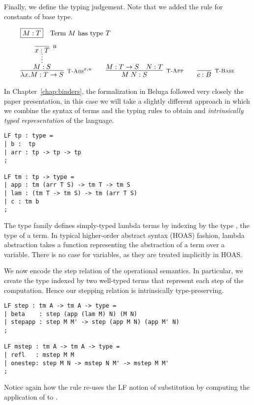Finally, we define the typing judgement. Note that we added the rule
\TBase for constants of base type.

\[
\begin{array}{c}
\multicolumn{1}{l}{\mbox{\fbox{$M:T$}~~ \mbox{Term $M$ has type $T$}}} \\[1em]
\infer[\TFn^{x,u}]{\lam x.M : T \arrow S}
                 {\infer*{M:S}{\infer[u]{x:T}{}}} \qquad
\infer[\TApp]{M\;N : S}{M : T \arrow S & N:T} \qquad
\infer[\TBase]{c : B}{}
\end{array}
\]

In Chapter~\ref{chap:binders}, the formalization in Beluga followed
very closely the paper presentation, in this case we will take a
slightly different approach in which we combine the syntax of terms
and the typing rules to obtain and \emph{intrinsically typed
  representation} of the language.

\begin{lstlisting}
LF tp : type =
| b :  tp
| arr : tp -> tp -> tp
;

LF tm : tp -> type =
| app : tm (arr T S) -> tm T -> tm S
| lam : (tm T -> tm S) -> tm (arr T S)
| c : tm b
;
\end{lstlisting}

The type family  defines simply-typed lambda terms by 
indexing  by the type , the type of a term. In typical higher-order
abstract syntax (HOAS) fashion, lambda abstraction takes a function
representing the abstraction of a term over a variable. There is no
case for variables, as they are treated implicitly in HOAS.

We now encode the step relation of the operational semantics. In
particular, we create the  type indexed by two well-typed terms that
represent each step of the computation. Hence our stepping relation is
intrinsically type-preserving. 

\begin{lstlisting}
LF step : tm A -> tm A -> type =
| beta    : step (app (lam M) N) (M N)
| stepapp : step M M' -> step (app M N) (app M' N)
;

LF mstep : tm A -> tm A -> type = 
| refl   : mstep M M
| onestep: step M N -> mstep N M' -> mstep M M'
;
\end{lstlisting}

Notice again how the  rule re-uses the LF notion of substitution by
computing the application of  to .

